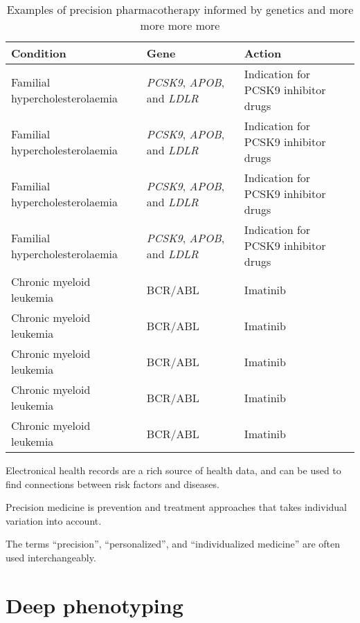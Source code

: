 \begin{table*}[h]
    \footnotesize
    \centering
    \begin{tabularx}{0.9\textwidth}{XlX} \toprule
    Condition & Gene & Action \\
    \midrule
    Familial hypercholesterolaemia & \textit{PCSK9}, \textit{APOB}, and \textit{LDLR} & Indication for PCSK9 inhibitor drugs \\
    Familial hypercholesterolaemia & \textit{PCSK9}, \textit{APOB}, and \textit{LDLR} & Indication for PCSK9 inhibitor drugs \\
    Familial hypercholesterolaemia & \textit{PCSK9}, \textit{APOB}, and \textit{LDLR} & Indication for PCSK9 inhibitor drugs \\
    Familial hypercholesterolaemia & \textit{PCSK9}, \textit{APOB}, and \textit{LDLR} & Indication for PCSK9 inhibitor drugs \\
    Chronic myeloid leukemia       & BCR/ABL & Imatinib \\
    Chronic myeloid leukemia       & BCR/ABL & Imatinib \\
    Chronic myeloid leukemia       & BCR/ABL & Imatinib \\
    Chronic myeloid leukemia       & BCR/ABL & Imatinib \\
    Chronic myeloid leukemia       & BCR/ABL & Imatinib \\
    \bottomrule
    \end{tabularx}
    \caption[Precision drugs]{
        Examples of precision pharmacotherapy informed by genetics 
        and more more more more
    }
\end{table*}



Electronical health records are a rich source of health data,
and can be used to find connections between risk factors and diseases.

Precision medicine is prevention and treatment approaches
that takes individual variation into account.


The terms
\enquote{precision},
\enquote{personalized},
and \enquote{individualized medicine}
are often used interchangeably.






\section{Deep phenotyping} \label{deep-pheno}

